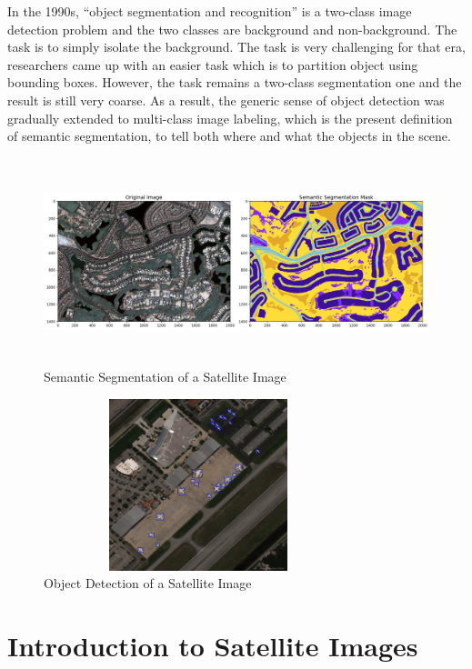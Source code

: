 In the 1990s, “object segmentation and recognition” is a two-class image detection problem and the two classes are background and non-background. The task is to simply isolate the background. The task is very challenging for that era, researchers came up with an easier task which is to partition object using bounding boxes. However, the task remains a two-class segmentation one and the result is still very coarse. As a result, the generic sense of object detection was gradually extended to multi-class image labeling, which is the present definition of semantic segmentation, to tell both where and what the objects in the scene.
\begin{figure}[ht]
\includegraphics[width=12cm, height=6cm]{images/semantic segmentation example.jpg}
\centering
\caption{Semantic Segmentation of a Satellite Image}
\label{fig:example of semantic segmentation}
\end{figure}

\begin{figure}[ht]
\includegraphics[width=9cm, height=5cm]{images/airport object detection.jpeg}
\centering
\caption{Object Detection of a Satellite Image}
\label{fig:airport object detection}
\end{figure}

\section{Introduction to Satellite Images}

